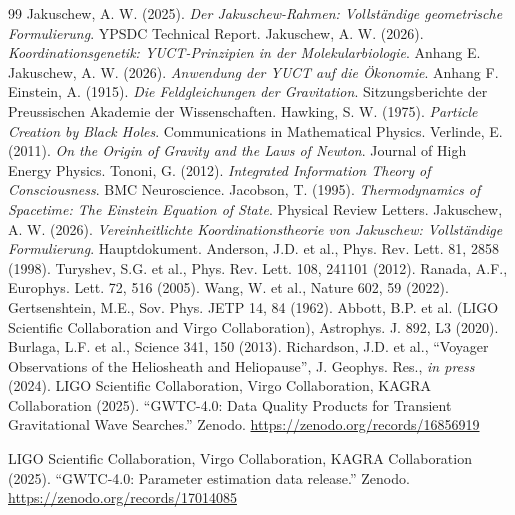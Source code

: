 \documentclass[12pt,a4paper]{article}
\theoremstyle{remark}
\begin{document}
	\begin{thebibliography}{99}
		 Jakuschew, A. W. (2025). \emph{Der Jakuschew-Rahmen: Vollständige geometrische Formulierung}. YPSDC Technical Report.
		 Jakuschew, A. W. (2026). \emph{Koordinationsgenetik: YUCT-Prinzipien in der Molekularbiologie}. Anhang E.
		 Jakuschew, A. W. (2026). \emph{Anwendung der YUCT auf die Ökonomie}. Anhang F.
		 Einstein, A. (1915). \emph{Die Feldgleichungen der Gravitation}. Sitzungsberichte der Preussischen Akademie der Wissenschaften.
		 Hawking, S. W. (1975). \emph{Particle Creation by Black Holes}. Communications in Mathematical Physics.
		 Verlinde, E. (2011). \emph{On the Origin of Gravity and the Laws of Newton}. Journal of High Energy Physics.
		 Tononi, G. (2012). \emph{Integrated Information Theory of Consciousness}. BMC Neuroscience.
		 Jacobson, T. (1995). \emph{Thermodynamics of Spacetime: The Einstein Equation of State}. Physical Review Letters.
		 Jakuschew, A. W. (2026). \emph{Vereinheitlichte Koordinationstheorie von Jakuschew: Vollständige Formulierung}. Hauptdokument.
		Anderson, J.D. et al., Phys. Rev. Lett. 81, 2858 (1998).
		Turyshev, S.G. et al., Phys. Rev. Lett. 108, 241101 (2012).
		Ranada, A.F., Europhys. Lett. 72, 516 (2005).
		Wang, W. et al., Nature 602, 59 (2022).
		Gertsenshtein, M.E., Sov. Phys. JETP 14, 84 (1962).
		Abbott, B.P. et al. (LIGO Scientific Collaboration and Virgo Collaboration), Astrophys. J. 892, L3 (2020).
		Burlaga, L.F. et al., Science 341, 150 (2013).
		Richardson, J.D. et al., ``Voyager Observations of the Heliosheath and Heliopause'', J. Geophys. Res., \textit{in press} (2024).
		LIGO Scientific Collaboration, Virgo Collaboration, KAGRA Collaboration (2025). ``GWTC-4.0: Data Quality Products for Transient Gravitational Wave Searches.'' Zenodo. \url{https://zenodo.org/records/16856919}
		
		LIGO Scientific Collaboration, Virgo Collaboration, KAGRA Collaboration (2025). ``GWTC-4.0: Parameter estimation data release.'' Zenodo. \url{https://zenodo.org/records/17014085}
		

\end{thebibliography}
\end{document}
